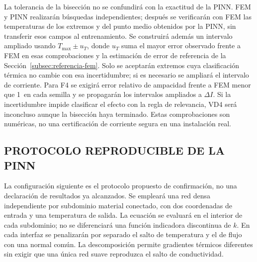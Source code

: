 La tolerancia de la bisección no se confundirá con la exactitud de la PINN. FEM y PINN realizarán búsquedas independientes; después se verificarán con FEM las temperaturas de los extremos y del punto medio obtenidos por la PINN, sin transferir esos campos al entrenamiento. Se construirá además un intervalo ampliado usando $T_{\max}\pm u_T$, donde $u_T$ suma el mayor error observado frente a FEM en esas comprobaciones y la estimación de error de referencia de la Sección~\ref{subsec:referencia-fem}. Solo se aceptarán extremos cuya clasificación térmica no cambie con esa incertidumbre; si es necesario se ampliará el intervalo de corriente. Para F4 se exigirá error relativo de ampacidad frente a FEM menor que 1\,\pct{} en cada semilla y se propagarán los intervalos ampliados a $\Delta I$. Si la incertidumbre impide clasificar el efecto con la regla de relevancia, VD4 será inconcluso aunque la bisección haya terminado. Estas comprobaciones son numéricas, no una certificación de corriente segura en una instalación real.

\subsection{PROTOCOLO REPRODUCIBLE DE LA PINN}
\label{subsec:protocolo-pinn}

La configuración siguiente es el protocolo propuesto de confirmación, no una declaración de resultados ya alcanzados. Se empleará una red densa independiente por subdominio material conectado, con dos coordenadas de entrada y una temperatura de salida. La ecuación se evaluará en el interior de cada subdominio; no se diferenciará una función indicadora discontinua de $k$. En cada interfaz se penalizarán por separado el salto de temperatura y el de flujo con una normal común. La descomposición permite gradientes térmicos diferentes sin exigir que una única red suave reproduzca el salto de conductividad.


